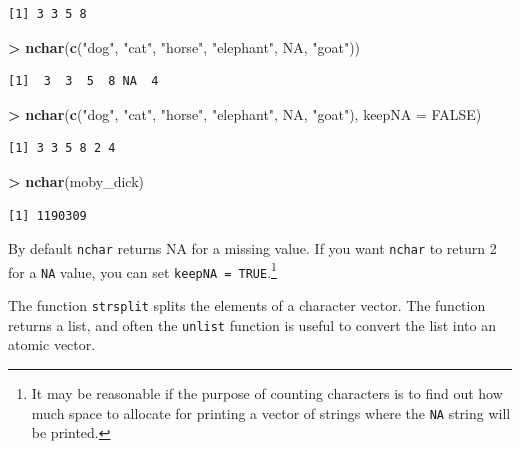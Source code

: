 \documentclass[
]{krantz}
\makeatletter
\newenvironment{Shaded}{\begin{snugshade}}{\end{snugshade}}
\newcommand{\DataTypeTok}[1]{\textcolor[rgb]{0.27,0.27,0.27}{#1}}
\newcommand{\KeywordTok}[1]{\textcolor[rgb]{0.27,0.27,0.27}{\textbf{#1}}}
\newcommand{\NormalTok}[1]{#1}
\newcommand{\OperatorTok}[1]{\textcolor[rgb]{0.43,0.43,0.43}{\textbf{#1}}}
\newcommand{\OtherTok}[1]{\textcolor[rgb]{0.37,0.37,0.37}{#1}}
\newcommand{\StringTok}[1]{\textcolor[rgb]{0.5,0.5,0.5}{#1}}
\newenvironment{kframe}{%
\medskip{}
\setlength{\fboxsep}{.8em}
 \def\at@end@of@kframe{}%
 \ifinner\ifhmode%
  \def\at@end@of@kframe{\end{minipage}}%
  \begin{minipage}{\columnwidth}%
 \fi\fi%
 \def\FrameCommand##1{\hskip\@totalleftmargin \hskip-\fboxsep
 \colorbox{shadecolor}{##1}\hskip-\fboxsep
     \hskip-\linewidth \hskip-\@totalleftmargin \hskip\columnwidth}%
 \MakeFramed {\advance\hsize-\width
   \@totalleftmargin\z@ \linewidth\hsize
   \@setminipage}}%
 {\par\unskip\endMakeFramed%
 \at@end@of@kframe}
\renewenvironment{Shaded}{\begin{kframe}}{\end{kframe}}
\makeatother
\begin{document}
\begin{verbatim}
[1] 3 3 5 8
\end{verbatim}

\begin{Shaded}
\begin{Highlighting}[]
\OperatorTok{\textgreater{}}\StringTok{ }\KeywordTok{nchar}\NormalTok{(}\KeywordTok{c}\NormalTok{(}\StringTok{"dog"}\NormalTok{, }\StringTok{"cat"}\NormalTok{, }\StringTok{"horse"}\NormalTok{, }\StringTok{"elephant"}\NormalTok{, }\OtherTok{NA}\NormalTok{, }\StringTok{"goat"}\NormalTok{))}
\end{Highlighting}
\end{Shaded}

\begin{verbatim}
[1]  3  3  5  8 NA  4
\end{verbatim}

\begin{Shaded}
\begin{Highlighting}[]
\OperatorTok{\textgreater{}}\StringTok{ }\KeywordTok{nchar}\NormalTok{(}\KeywordTok{c}\NormalTok{(}\StringTok{"dog"}\NormalTok{, }\StringTok{"cat"}\NormalTok{, }\StringTok{"horse"}\NormalTok{, }\StringTok{"elephant"}\NormalTok{, }\OtherTok{NA}\NormalTok{, }\StringTok{"goat"}\NormalTok{), }\DataTypeTok{keepNA =} \OtherTok{FALSE}\NormalTok{)}
\end{Highlighting}
\end{Shaded}

\begin{verbatim}
[1] 3 3 5 8 2 4
\end{verbatim}

\begin{Shaded}
\begin{Highlighting}[]
\OperatorTok{\textgreater{}}\StringTok{ }\KeywordTok{nchar}\NormalTok{(moby\_dick)}
\end{Highlighting}
\end{Shaded}

\begin{verbatim}
[1] 1190309
\end{verbatim}

By default \texttt{nchar} returns NA for a missing value. If you want \texttt{nchar} to return 2 for a \texttt{NA} value, you can set \texttt{keepNA\ =\ TRUE}.\footnote{It may be reasonable if the purpose of counting characters is to find out how much space to allocate for printing a vector of strings where the \texttt{NA} string will be printed.}

The function \texttt{strsplit} splits the elements of a character vector. The function returns a list, and often the \texttt{unlist} function is useful to convert the list into an atomic vector.
\end{document}
